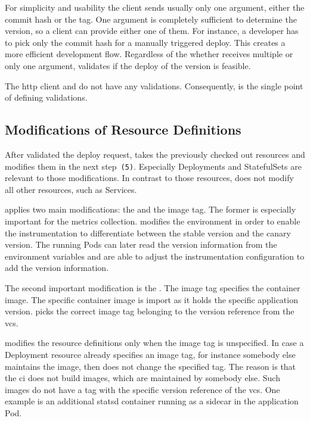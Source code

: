For simplicity and usability the client sends usually only one argument, either the commit
hash or the tag. One argument is completely sufficient to determine the version, so a
client can provide either one of them. For instance, a developer has to pick only the
commit hash for a manually triggered deploy. This creates a more efficient development
flow. Regardless of the whether \deployer receives multiple or only one argument, \deployer
validates if the deploy of the version is feasible.

The http client and \depctl do not have any validations. Consequently, \deployer is the
single point of defining validations.

\subsection{Modifications of Resource Definitions}

After \deployer validated the deploy request, \deployer takes the previously checked out
resources and modifies them in the next step~\texttt{(5)}. Especially Deployments and
StatefulSets are relevant to those modifications. In contrast to those resources, \deployer
does not modify all other resources, such as Services.

\deployer applies two main modifications: the  and the image tag. The
former is especially important for the metrics collection. \deployer modifies the
environment in order to enable the instrumentation to differentiate between the stable
version and the canary version. The running Pods can later read the version information
from the environment variables and are able to adjust the instrumentation configuration to
add the version information.

The second important modification is the . The image tag specifies the
container image. The specific container image is import as it holds the specific
application version. \deployer picks the correct image tag belonging to the version
reference from the \gls{vcs}.

\deployer modifies the resource definitions only when the image tag is unspecified. In
case a Deployment resource already specifies an image tag, for instance somebody else
maintains the image, then \deployer does not change the specified tag. The reason is that
the \gls{ci} does not build images, which are maintained by somebody else. Such images do
not have a tag with the specific version reference of the \gls{vcs}. One example is an
additional statsd container running as a sidecar in the application Pod.

